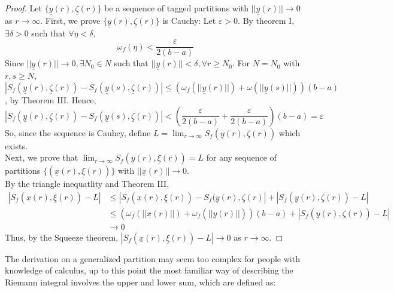\begin{proof}
    Let $\{\underline{y}(r), \underline{\zeta}(r)\}$ be a sequence of tagged partitions with $||\underline{y}(r)|| \to 0$ as $r \to \infty$.
    First, we prove $\{\underline{y}(r), \underline{\zeta}(r)\}$ is Cauchy: Let $\varepsilon > 0$. By theorem I, $\exists \delta>0$ such that $\forall \eta < \delta$,
    \begin{equation*}
        \omega_f(\eta) < \frac{\varepsilon}{2(b-a)}
    \end{equation*}
    Since $||\underline{y}(r)|| \to 0, \exists N_0 \in N$ such that $||\underline{y}(r)|| < \delta, \forall r \geq N_0$. For $N = N_0$ with $r,s \geq N$, $|S_f(\underline{y}(r), \underline{\zeta}(r)) - S_f(\underline{y}(s), \underline{\zeta}(r))| \leq (\omega_f(||\underline{y}(r)||) + \omega(||\underline{y}(s)||))(b-a)$, by Theorem III. Hence,
    \begin{equation*}
        |S_f(\underline{y}(r), \underline{\zeta}(r)) - S_f(\underline{y}(s), \underline{\zeta}(r))| < \left(
            \frac{\varepsilon}{2(b-a)} + \frac{\varepsilon}{2(b-a)}
        \right)(b-a) = \varepsilon
    \end{equation*}
    So, since the sequence is Cauhcy, define $L = \lim_{r \to \infty} S_f(\underline{y}(r), \underline{\zeta}(r))$ which exists. \\
    Next, we prove that $\lim_{r \to \infty} S_f(\underline{y}(r), \underline{\xi}(r)) = L$ for any sequence of partitions $\{(\underline{x}(r), \underline{\xi}(r))\}$ with $||\underline{x}(r)|| \to 0$. \\
    By the triangle inequatlity and Theorem III,
    \begin{align*}
        |S_f(\underline{x}(r), \underline{\xi}(r)) - L| &\leq |S_f(\underline{x}(r), \underline{\xi}(r)) - S_f(\underline{y}(r), \underline{\zeta}(r)| + |S_f(\underline{y}(r), \underline{\zeta}(r)) - L| \\
        &\leq (\omega_f(||\underline{x}(r)||) + \omega_f(||\underline{y}(r)||))(b-a) + |S_f(\underline{y}(r), \underline{\zeta}(r)) - L| \\
        &\to 0
    \end{align*}
    Thus, by the Squeeze theorem, $|S_f(\underline{x}(r), \underline{\xi}(r)) - L| \to 0$ as $r \to \infty$.
\end{proof}

The derivation on a generalized partition may seem too complex for people with knowledge of calculus, up to this point the most familiar way of describing the Riemann integral involves the upper and lower sum, which are defined as:

